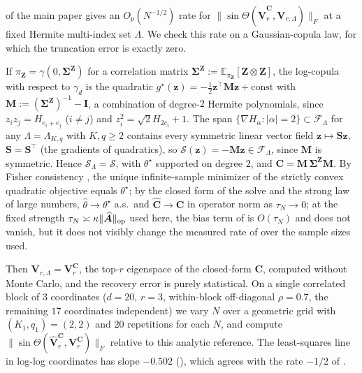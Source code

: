 \documentclass[supplement,review,hidelinks,onefignum,onetabnum]{siamart251216}
\newcommand{\EE}{\mathbb{E}}
\newcommand{\gauss}{\gamma}
\newcommand{\mC}{\bm{C}}
\newcommand{\hmC}{\widehat{\bm{C}}}
\newcommand{\mV}{\bm{V}}
\newcommand{\hmV}{\widehat{\bm{V}}}
\newcommand{\mM}{\bm{M}}
\newcommand{\mI}{\bm{I}}
\newcommand{\vz}{\bm{z}}
\newcommand{\vZ}{\bm{Z}}
\newcommand{\scS}{\mathcal{S}}
\newcommand{\scF}{\mathcal{F}}
\newcommand{\hmA}{\widehat{\bm{A}}}
\begin{document}
 of the main paper gives an $O_p(N^{-1/2})$ rate for $\|\sin\Theta(\hmV_r^{\mC}, \mV_{r,\Lambda})\|_F$ at a fixed Hermite multi-index set $\Lambda$. We check this rate on a Gaussian-copula law, for which the truncation error is exactly zero. \begin{remark}
\label{rem:gaussian-copula}
If $\pi_{\vZ} = \gauss(0,\bm\Sigma^{\vZ})$ for a correlation matrix $\bm\Sigma^{\vZ} := \EE_{\pi_{\vZ}}[\vZ\otimes\vZ]$, the log-copula with respect to $\gauss_d$ is the quadratic $g^\star(\vz) = -\tfrac12\vz^\top \mM\vz + \mathrm{const}$ with $\mM := (\bm\Sigma^{\vZ})^{-1} - \mI$, a combination of degree-$2$ Hermite polynomials, since $z_iz_j = H_{e_i+e_j}$ ($i\ne j$) and $z_i^2 = \sqrt2 H_{2e_i} + 1$. The span $\{\nabla H_\alpha : |\alpha|=2\}\subset\scF_\Lambda$ for any $\Lambda = \Lambda_{K,q}$ with $K, q \ge 2$ contains every symmetric linear vector field $\vz \mapsto \bm S\vz$, $\bm S = \bm S^\top$ (the gradients of quadratics), so $\scS(\vz) = -\mM\vz \in \scF_\Lambda$, since $\mM$ is symmetric. Hence $\scS_\Lambda = \scS$, with $\theta^\star$ supported on degree $2$, and $\mC = \mM\,\bm\Sigma^{\vZ}\mM$. By Fisher consistency \cite[Thm.~2, Cor.~3]{Hyvarinen2005}, the unique infinite-sample minimizer of the strictly convex quadratic objective equals $\theta^\star$; by the closed form of the solve and the strong law of large numbers, $\widehat\theta \to \theta^\star$ a.s.\ and $\hmC \to \mC$ in operator norm as $\tau_N \to 0$; at the fixed strength $\tau_N \asymp \kappa\|\hmA\|_{\rm op}$ used here, the bias term of  is $O(\tau_N)$ and does not vanish, but it does not visibly change the measured rate of  over the sample sizes used.
\end{remark}
Then $\mV_{r,\Lambda} = \mV_r^{\mC}$, the top-$r$ eigenspace of the closed-form $\mC$, computed without Monte Carlo, and the recovery error is purely statistical. On a single correlated block of $3$ coordinates ($d = 20$, $r = 3$, within-block off-diagonal $\rho = 0.7$, the remaining $17$ coordinates independent) we vary $N$ over a geometric grid with $(K_1, q_1) = (2, 2)$ and $20$ repetitions for each $N$, and compute $\|\sin\Theta(\hmV_r^{\mC}, \mV_r^{\mC})\|_F$ relative to this analytic reference. The least-squares line in log-log coordinates has slope $-0.502$ (), which agrees with the rate $-1/2$ of .
\end{document}
